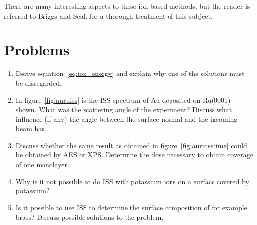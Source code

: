 There are many interesting aspects to these ion based methods, but the reader is referred to Briggs and Seah for a thorough treatment \cite{briggs2} of this subject.


\section{Problems}
\begin{enumerate}
\item Derive equation~\autoref{eq:ion_energy} and explain why one of the solutions must be disregarded.

\item In figure~\autoref{fig:auruiss} is the ISS spectrum of Au deposited on Ru(0001) shown. What was the scattering angle of the experiment? Discuss what influence (if any) the angle between the surface normal and the incoming beam has.

\item Discuss whether the same result as obtained in figure~\autoref{fig:auruisstime} could be obtained by AES or XPS. Determine the dose necessary to obtain coverage of one monolayer.

\item Why is it not possible to do ISS with potassium ions on a surface covered by potassium?

\item Is it possible to use ISS to determine the surface composition of for example brass? Discuss possible solutions to the problem.
\end{enumerate}
